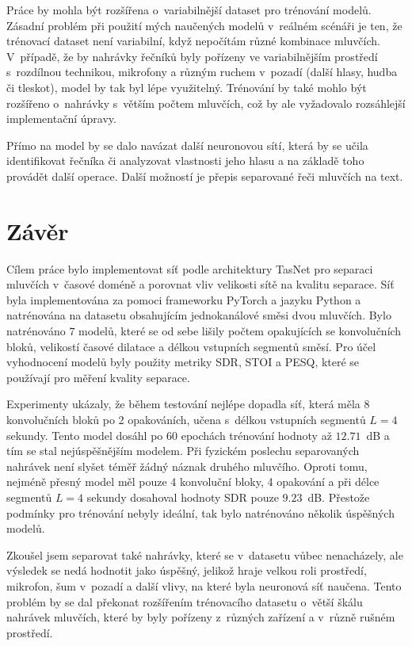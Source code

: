 Práce by mohla být rozšířena o~variabilnější dataset pro trénování modelů. Zásadní problém při použití mých naučených modelů v~reálném scénáři je ten, že trénovací dataset není variabilní, když nepočítám různé kombinace mluvčích. V~případě, že by nahrávky řečníků byly pořízeny ve variabilnějším prostředí s~rozdílnou technikou, mikrofony a různým ruchem v~pozadí (další hlasy, hudba či tleskot), model by tak byl lépe využitelný. Trénování by také mohlo být rozšířeno o~nahrávky s~větším počtem mluvčích, což by ale vyžadovalo rozsáhlejší implementační úpravy.

Přímo na model by se dalo navázat další neuronovou sítí, která by se učila identifikovat řečníka či analyzovat vlastnosti jeho hlasu a na základě toho provádět další operace. Další možností je přepis separované řeči mluvčích na text. 


\chapter{Závěr}
\label{zaver}
Cílem práce bylo implementovat síť podle architektury TasNet pro separaci mluvčích v~časové doméně a porovnat vliv velikosti sítě na kvalitu separace. Síť byla implementována za pomoci frameworku PyTorch a jazyku Python a natrénována na datasetu obsahujícím jednokanálové směsi dvou mluvčích. Bylo natrénováno $7$ modelů, které se od sebe lišily počtem opakujících se konvolučních bloků, velikostí časové dilatace a délkou vstupních segmentů směsí. Pro účel vyhodnocení modelů byly použity metriky SDR, STOI a PESQ, které se používají pro měření kvality separace. 

Experimenty ukázaly, že během testování nejlépe dopadla síť, která měla 8 konvolučních bloků po 2 opakováních, učena s~délkou vstupních segmentů $L=4$ sekundy. Tento model dosáhl po 60 epochách trénování hodnoty až $12.71$~dB a tím se stal nejúspěšnějším modelem. Při fyzickém poslechu separovaných nahrávek není slyšet téměř žádný náznak druhého mluvčího. Oproti tomu, nejméně přesný model měl pouze 4 konvoluční bloky, 4 opakování a při délce segmentů $L=4$ sekundy dosahoval hodnoty SDR pouze $9.23$~dB. Přestože podmínky pro trénování nebyly ideální, tak bylo natrénováno několik úspěšných modelů.

Zkoušel jsem separovat také nahrávky, které se v~datasetu vůbec nenacházely, ale výsledek se nedá hodnotit jako úspěšný, jelikož hraje velkou roli prostředí, mikrofon, šum v~pozadí a další vlivy, na které byla neuronová síť naučena. Tento problém by se dal překonat rozšířením trénovacího datasetu o~větší škálu nahrávek mluvčích, které by byly pořízeny z~různých zařízení a v~různě rušném prostředí.


